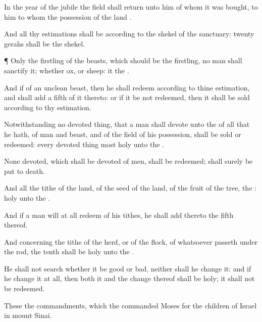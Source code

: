 {In the
year of the
jubile the
field shall
return unto him of whom it was
bought,
{} to him to whom the
possession of the
land
{}.

And all thy
estimations shall be according to the
shekel of the
sanctuary:
twenty
gerahs shall be the
shekel.


\par }{\PP {}¶ Only the
firstling of the
beasts, which should be the
{}
firstling, no
man shall
sanctify it; whether
{}
ox, or
sheep: it
{} the
{}.

And if
{} of an
unclean
beast, then he shall
redeem
{} according to thine
estimation, and shall
add a
fifth
{} of it thereto: or if it be not
redeemed, then it shall be
sold according to thy
estimation.

Notwithstanding no devoted
thing, that a
man shall
devote unto the
{} of all that he hath,
{} of
man and
beast, and of the
field of his
possession, shall be
sold or
redeemed: every devoted
thing
{}
most
holy unto the
{}.

None
devoted, which shall
be
devoted of
men, shall be
redeemed;
{} shall
surely be put to
death.

And all the
tithe of the
land,
{} of the
seed of the
land,
{} of the
fruit of the
tree,
{} the
{}:
{}
holy unto the
{}.

And if a
man will at
all
redeem
{} of his
tithes, he shall
add thereto the
fifth
{} thereof.

And concerning the
tithe of the
herd, or of the
flock,
{} of whatsoever
passeth under the
rod, the
tenth shall be
holy unto the
{}.

He shall not
search whether it be
good or
bad, neither shall he
change it: and if he
change it at
all, then both it and the
change thereof shall be
holy; it shall not be
redeemed.

These
{} the
commandments, which the
{}
commanded
Moses for the
children of
Israel in
mount
Sinai.


\par }